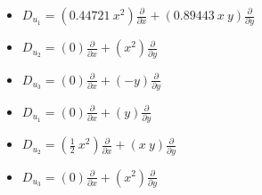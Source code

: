 
\begin{itemize}
  \item $D_{u_1} = (0.44721 ~ x^{2}) \frac{\partial}{\partial x} + (0.89443 ~ x ~ y) \frac{\partial}{\partial y}$
  \item $D_{u_2} = (0) \frac{\partial}{\partial x} + (x^{2}) \frac{\partial}{\partial y}$
  \item $D_{u_3} = (0) \frac{\partial}{\partial x} + ( - y) \frac{\partial}{\partial y}$
\end{itemize}

\begin{itemize}
  \item $D_{u_1} = (0) \frac{\partial}{\partial x} + (y) \frac{\partial}{\partial y}$
  \item $D_{u_2} = (\frac{1}{2} ~ x^{2}) \frac{\partial}{\partial x} + (x ~ y) \frac{\partial}{\partial y}$
  \item $D_{u_3} = (0) \frac{\partial}{\partial x} + (x^{2}) \frac{\partial}{\partial y}$
\end{itemize}
